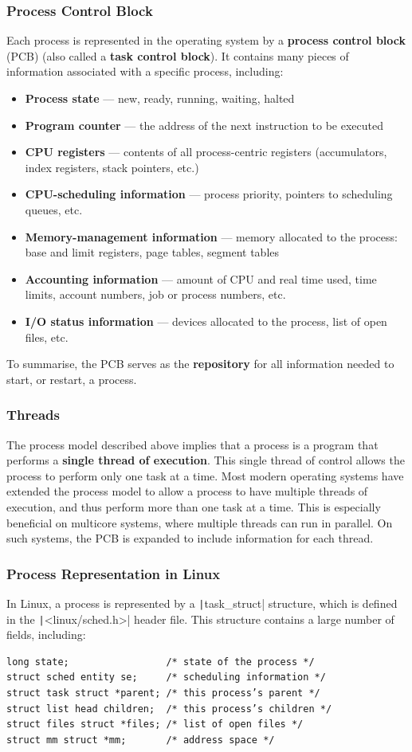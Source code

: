 \documentclass{article}
\begin{document}
\subsubsection{Process Control Block}
Each process is represented in the operating system by a
\textbf{process control block} (PCB) (also called a \textbf{task
control block}). It contains many pieces of information associated with
a specific process, including:
\begin{itemize}
    \item \textbf{Process state} --- new, ready, running, waiting, halted
    \item \textbf{Program counter} --- the address of the next
          instruction to be executed
    \item \textbf{CPU registers} --- contents of all process-centric
          registers (accumulators, index registers, stack pointers, etc.)
    \item \textbf{CPU-scheduling information} --- process priority, pointers to scheduling queues, etc.
    \item \textbf{Memory-management information} --- memory allocated to the process: base and limit registers, page tables, segment tables
    \item \textbf{Accounting information} --- amount of CPU and real time used, time limits, account numbers, job or process numbers, etc.
    \item \textbf{I/O status information} --- devices allocated to the process, list of open files, etc.
\end{itemize}
To summarise, the PCB serves as the \textbf{repository} for all
information needed to start, or restart, a process.
\subsubsection{Threads}
The process model described above implies that a process is a program
that performs a \textbf{single thread of execution}. This single thread
of control allows the process to perform only one task at a time. Most
modern operating systems have extended the process model to allow a
process to have multiple threads of execution, and thus perform more
than one task at a time. This is especially beneficial on multicore
systems, where multiple threads can run in parallel. On such systems,
the PCB is expanded to include information for each thread.
\subsubsection{Process Representation in Linux}
In Linux, a process is represented by a \texttt|task_struct|
structure, which is defined in the \texttt|<linux/sched.h>|
header file. This structure contains a large number of fields,
including:
\begin{verbatim}
long state;                 /* state of the process */
struct sched entity se;     /* scheduling information */
struct task struct *parent; /* this process’s parent */
struct list head children;  /* this process’s children */
struct files struct *files; /* list of open files */
struct mm struct *mm;       /* address space */
\end{verbatim}
\end{document}
